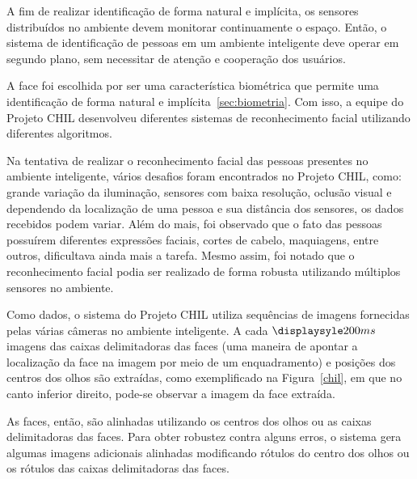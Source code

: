 A fim de realizar identificação de forma natural e implícita, os sensores distribuídos no ambiente devem monitorar continuamente o espaço. Então, o sistema de identificação de pessoas em um ambiente inteligente deve operar em segundo plano, sem necessitar de atenção e cooperação dos usuários. 

A face foi escolhida por ser uma característica biométrica que permite uma identificação de forma natural e implícita~\ref{sec:biometria}. Com isso, a equipe do Projeto CHIL desenvolveu diferentes sistemas de reconhecimento facial utilizando diferentes algoritmos. 

Na tentativa de realizar o reconhecimento facial das pessoas presentes no ambiente inteligente, vários desafios foram encontrados no Projeto CHIL, como: grande variação da iluminação, sensores com baixa resolução, oclusão visual e dependendo da localização de uma pessoa e sua distância dos sensores, os dados recebidos podem variar.  Além do mais, foi observado que o fato das pessoas possuírem diferentes expressões faciais, cortes de cabelo, maquiagens, entre outros, dificultava ainda mais a tarefa. Mesmo assim, foi notado que o reconhecimento facial podia ser realizado de forma robusta utilizando múltiplos sensores no ambiente.

Como dados, o sistema do Projeto CHIL utiliza sequências de imagens fornecidas pelas várias câmeras no ambiente inteligente. A cada $\displaysyle 200ms$ imagens das caixas delimitadoras das faces (uma maneira de apontar a localização da face na imagem por meio de um enquadramento) e posições dos centros dos olhos são extraídas, como exemplificado na Figura~\ref{chil}, em que no canto inferior direito, pode-se observar a imagem da face extraída. 

As faces, então, são alinhadas utilizando os centros dos olhos ou as caixas delimitadoras das faces. Para obter robustez contra alguns erros, o sistema gera algumas imagens adicionais alinhadas modificando rótulos do centro dos olhos ou os rótulos das caixas delimitadoras das faces.

